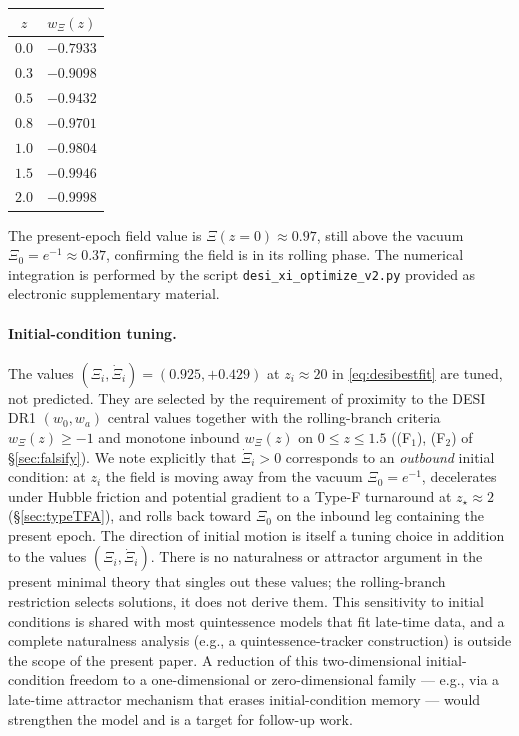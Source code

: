 \documentclass[11pt,reqno]{amsart}
\theoremstyle{plain}
\theoremstyle{definition}
\theoremstyle{remark}
\begin{document}
\begin{center}
\begin{tabular}{c|c}
$z$ & $w_\Xi(z)$\\
\hline
$0.0$ & $-0.7933$\\
$0.3$ & $-0.9098$\\
$0.5$ & $-0.9432$\\
$0.8$ & $-0.9701$\\
$1.0$ & $-0.9804$\\
$1.5$ & $-0.9946$\\
$2.0$ & $-0.9998$
\end{tabular}
\end{center}

The present-epoch field value is $\Xi(z=0) \approx 0.97$, still above
the vacuum $\Xi_0 = e^{-1} \approx 0.37$, confirming the field is in
its rolling phase. The numerical integration is performed by the
script \texttt{desi\_xi\_optimize\_v2.py} provided as electronic
supplementary material.

\paragraph{Initial-condition tuning.}
The values $(\Xi_i, \dot\Xi_i) = (0.925, +0.429)$ at $z_i \approx 20$ in
\eqref{eq:desibestfit} are tuned, not predicted. They are selected by
the requirement of proximity to the DESI DR1 $(w_0, w_a)$ central values
together with the rolling-branch criteria $w_\Xi(z) \geq -1$ and
monotone inbound $w_\Xi(z)$ on $0 \leq z \leq 1.5$ ((F$_1$), (F$_2$) of
\S\ref{sec:falsify}). We note explicitly that $\dot\Xi_i > 0$
corresponds to an \emph{outbound} initial condition: at $z_i$ the
field is moving away from the vacuum $\Xi_0 = e^{-1}$, decelerates
under Hubble friction and potential gradient to a Type-F turnaround at
$z_\star \approx 2$ (\S\ref{sec:typeTFA}), and rolls back toward $\Xi_0$
on the inbound leg containing the present epoch. The direction of
initial motion is itself a tuning choice in addition to the values
$(\Xi_i, \dot\Xi_i)$. There is no naturalness or attractor argument in
the present minimal theory that singles out these values; the
rolling-branch restriction selects solutions, it does not derive them.
This sensitivity to initial conditions is shared with most
quintessence models that fit late-time data, and a complete
naturalness analysis (e.g., a quintessence-tracker construction) is
outside the scope of the present paper. A reduction of this
two-dimensional initial-condition freedom to a one-dimensional or
zero-dimensional family --- e.g., via a late-time attractor mechanism
that erases initial-condition memory --- would strengthen the model
and is a target for follow-up work.
\end{document}
